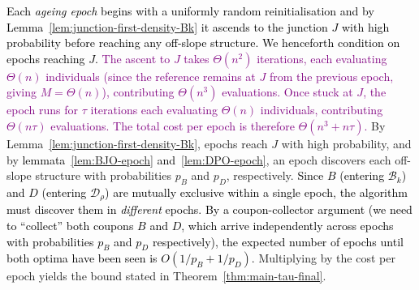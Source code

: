 \documentclass[lettersize,journal]{IEEEtran}
\newcommand{\rerev}[1]{\textcolor{purple}{#1}}
\begin{document}
\textcolor{black}{Each \emph{ageing epoch} begins with a uniformly random reinitialisation and by Lemma~\ref{lem:junction-first-density-Bk} it
ascends to the junction $J$ with high probability before reaching any
off-slope structure.  We henceforth condition on epochs reaching $J$.}
\rerev{The ascent to $J$ takes $\Theta(n^2)$ iterations, each evaluating $\Theta(n)$ individuals (since the reference remains at $J$ from the previous epoch, giving $M=\Theta(n)$), contributing $\Theta(n^3)$ evaluations.  Once stuck at $J$, the epoch runs for $\tau$ iterations each evaluating $\Theta(n)$ individuals, contributing $\Theta(n\tau)$ evaluations.  The total cost per epoch is therefore $\Theta(n^3 + n\tau)$.}
By Lemma~\ref{lem:junction-first-density-Bk}, epochs reach $J$ with high probability, and by \textcolor{black}{lemmata~\ref{lem:BJO-epoch} and~\ref{lem:DPO-epoch}}, an epoch discovers each off-slope structure with probabilities $p_B$ and $p_D$, respectively.
\textcolor{black}{Since $B$ (entering $\mathcal{B}_k$) and $D$ (entering $\mathcal{D}_\rho$) are
mutually exclusive within a single epoch, the algorithm must discover them in
\emph{different} epochs.
By a coupon-collector argument (we need to ``collect'' both coupons $B$ and
$D$, which arrive independently across epochs with probabilities $p_B$ and
$p_D$ respectively), the expected number of epochs until both optima have been seen
is $O(1/p_B + 1/p_D)$.}
Multiplying by the cost per epoch yields the bound stated in Theorem~\ref{thm:main-tau-final}.
\end{document}
